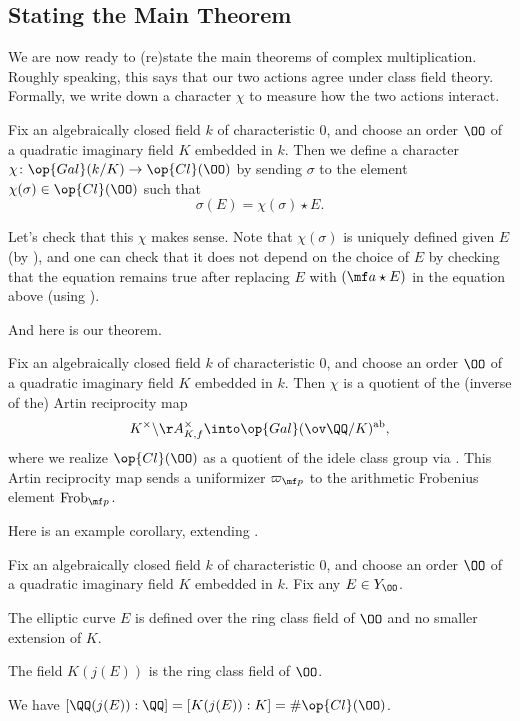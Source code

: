\documentclass[../notes.tex]{subfiles}
\begin{document}
\subsection{Stating the Main Theorem}
We are now ready to (re)state the main theorems of complex multiplication. Roughly speaking, this says that our two actions agree under class field theory. Formally, we write down a character $\chi$ to measure how the two actions interact.
\begin{notation}
	Fix an algebraically closed field $k$ of characteristic $0$, and choose an order $\OO$ of a quad\-ratic imaginary field $K$ embedded in $k$. Then we define a character $\chi\colon\op{Gal}(k/K)\to\op{Cl}(\OO)$ by sending $\sigma$ to the element $\chi(\sigma)\in\op{Cl}(\OO)$ such that
	\[\sigma(E)=\chi(\sigma)\star E.\]
\end{notation}
\begin{remark}
	Let's check that this $\chi$ makes sense. Note that $\chi(\sigma)$ is uniquely defined given $E$ (by ), and one can check that it does not depend on the choice of $E$ by checking that the equation remains true after replacing $E$ with $(\mf a\star E)$ in the equation above (using ).
\end{remark}
And here is our theorem.
\begin{theorem}[Main] \label{thm:main-cm}
	Fix an algebraically closed field $k$ of characteristic $0$, and choose an order $\OO$ of a quad\-ratic imaginary field $K$ embedded in $k$. Then $\chi$ is a quotient of the (inverse of the) Artin reciprocity map
	\[K^\times\backslash\AA_{K,f}^\times\into\op{Gal}(\ov\QQ/K)^{\mathrm{ab}},\]
	where we realize $\op{Cl}(\OO)$ as a quotient of the idele class group via . This Artin reciprocity map sends a uniformizer $\varpi_{\mf p}$ to the arithmetic Frobenius element $\mathrm{Frob}_{\mf p}$.
\end{theorem}
Here is an example corollary, extending .
\begin{corollary} \label{cor:hilbert-class-field-by-cm}
	Fix an algebraically closed field $k$ of characteristic $0$, and choose an order $\OO$ of a quad\-ratic imaginary field $K$ embedded in $k$. Fix any $E\in Y_\OO$.
	\begin{listalph}
		\item The elliptic curve $E$ is defined over the ring class field of $\OO$ and no smaller extension of $K$.
		\item The field $K(j(E))$ is the ring class field of $\OO$.
		\item We have $[\QQ(j(E)):\QQ]=[K(j(E)):K]=\#\op{Cl}(\OO)$.
	\end{listalph}
\end{corollary}
\end{document}
